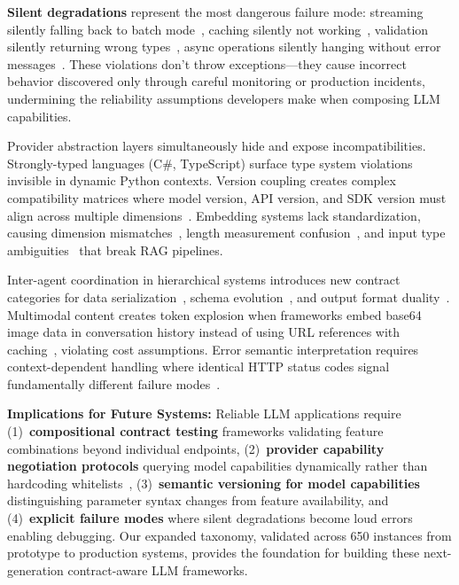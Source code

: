 \documentclass[11pt]{article}
\begin{document}
\textbf{Silent degradations} represent the most dangerous failure mode: streaming silently falling back to batch mode~\cite{githublanggraph1454}, caching silently not working~\cite{githublangchainjs6705}, validation silently returning wrong types~\cite{githubllamaindex16604}, async operations silently hanging without error messages~\cite{githublanggraph1800}. These violations don't throw exceptions—they cause incorrect behavior discovered only through careful monitoring or production incidents, undermining the reliability assumptions developers make when composing LLM capabilities.

Provider abstraction layers simultaneously hide and expose incompatibilities. Strongly-typed languages (C\#, TypeScript) surface type system violations~\cite{githubsk10442,githubsk5796} invisible in dynamic Python contexts. Version coupling creates complex compatibility matrices where model version, API version, and SDK version must align across multiple dimensions~\cite{githubsk9459,githubsk7197,githublangchain31560}. Embedding systems lack standardization, causing dimension mismatches~\cite{githubllamaindex11278}, length measurement confusion~\cite{githubllamaindex12592}, and input type ambiguities~\cite{githubllamaindex11820} that break RAG pipelines.

Inter-agent coordination in hierarchical systems introduces new contract categories for data serialization~\cite{githubcrewai2606}, schema evolution~\cite{githubcrewai1744}, and output format duality~\cite{githubcrewai1258}. Multimodal content creates token explosion when frameworks embed base64 image data in conversation history instead of using URL references with caching~\cite{githubautogen2827}, violating cost assumptions. Error semantic interpretation requires context-dependent handling where identical HTTP status codes signal fundamentally different failure modes~\cite{githubautogpt7028}.

\textbf{Implications for Future Systems:} Reliable LLM applications require (1)~\textbf{compositional contract testing} frameworks validating feature combinations beyond individual endpoints, (2)~\textbf{provider capability negotiation protocols} querying model capabilities dynamically rather than hardcoding whitelists~\cite{githubcrewai2729}, (3)~\textbf{semantic versioning for model capabilities} distinguishing parameter syntax changes from feature availability, and (4)~\textbf{explicit failure modes} where silent degradations become loud errors enabling debugging. Our expanded taxonomy, validated across 650 instances from prototype to production systems, provides the foundation for building these next-generation contract-aware LLM frameworks.
\end{document}
